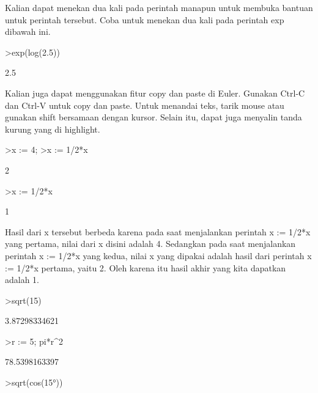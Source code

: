 \documentclass{article}
\begin{document}
\begin{eulernotebook}
\begin{eulercomment}
Kalian dapat menekan dua kali pada perintah manapun untuk membuka
bantuan untuk perintah tersebut. Coba untuk menekan dua kali pada
perintah exp dibawah ini.
\end{eulercomment}
\begin{eulerprompt}
>exp(log(2.5))
\end{eulerprompt}
\begin{euleroutput}
  2.5
\end{euleroutput}
\begin{eulercomment}
Kalian juga dapat menggunakan fitur copy dan paste di Euler. Gunakan
Ctrl-C dan Ctrl-V untuk copy dan paste. Untuk menandai teks, tarik
mouse atau gunakan shift bersamaan dengan kursor. Selain itu, dapat
juga menyalin tanda kurung yang di highlight.

\end{eulercomment}
\begin{eulerprompt}
>x := 4;
>x := 1/2*x
\end{eulerprompt}
\begin{euleroutput}
  2
\end{euleroutput}
\begin{eulerprompt}
>x := 1/2*x
\end{eulerprompt}
\begin{euleroutput}
  1
\end{euleroutput}
\begin{eulercomment}
Hasil dari x tersebut berbeda karena pada saat menjalankan perintah x
:= 1/2*x yang pertama, nilai dari x disini adalah 4. Sedangkan pada
saat menjalankan perintah x := 1/2*x yang kedua, nilai x yang dipakai
adalah hasil dari perintah x := 1/2*x pertama, yaitu 2. Oleh karena
itu hasil akhir yang kita dapatkan adalah 1.
\end{eulercomment}
\begin{eulerprompt}
>sqrt(15)
\end{eulerprompt}
\begin{euleroutput}
  3.87298334621
\end{euleroutput}
\begin{eulerprompt}
>r := 5; pi*r^2
\end{eulerprompt}
\begin{euleroutput}
  78.5398163397
\end{euleroutput}
\begin{eulerprompt}
>sqrt(cos(15°))
\end{eulerprompt}
\begin{euleroutput}

\end{euleroutput}
\end{eulernotebook}
\end{document}
